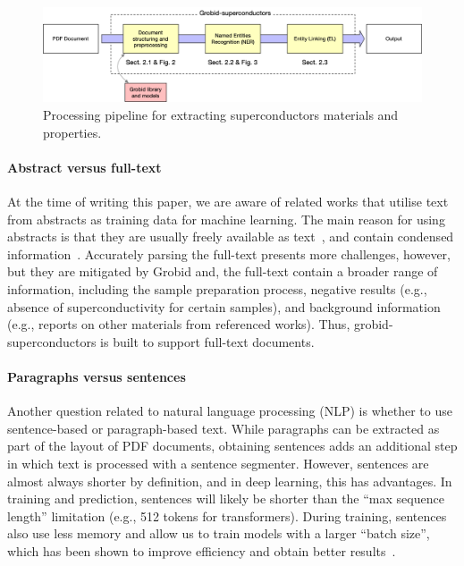 \begin{figure}[ht]
    \includegraphics[width=\textwidth]{figures/automatic_extraction_supercon/schema-architecture-colors.png}
    \caption{Processing pipeline for extracting superconductors materials and properties. }
    \label{fig:pipeline-overview}
\end{figure}

\paragraph*{Abstract versus full-text}
At the time of writing this paper, we are aware of related works that utilise text from abstracts as training data for machine learning.
The main reason for using abstracts is that they are usually freely available as text~\cite{kononova2019text}, and contain condensed information~\cite{yamaguchi-etal-2020-sc, court2020magnetic}.
Accurately parsing the full-text presents more challenges, however, but they are mitigated by Grobid and, the full-text contain a broader range of information, including the sample preparation process, negative results (e.g., absence of superconductivity for certain samples), and background information (e.g., reports on other materials from referenced works).
Thus, grobid-superconductors is built to support full-text documents.

\paragraph*{Paragraphs versus sentences}
Another question related to natural language processing (NLP) is whether to use sentence-based or paragraph-based text.
While paragraphs can be extracted as part of the layout of PDF documents, obtaining sentences adds an additional step in which text is processed with a sentence segmenter.
However, sentences are almost always shorter by definition, and in deep learning, this has advantages.
In training and prediction, sentences will likely be shorter than the ``max sequence length'' limitation (e.g., 512 tokens for transformers).
During training, sentences also use less memory and allow us to train models with a larger ``batch size'', which has been shown to improve efficiency and obtain better results~\cite{liu2019roberta}. 


